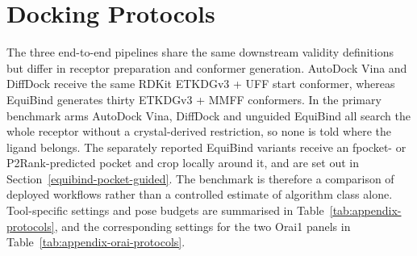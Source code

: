 \hypertarget{docking-protocols}{%
\chapter{Docking Protocols}\label{docking-protocols}}

The three end-to-end pipelines share the same downstream validity definitions but differ in receptor preparation and conformer generation. AutoDock Vina and DiffDock receive the same RDKit \cite{ref086} ETKDGv3 + UFF start conformer, whereas EquiBind generates thirty ETKDGv3 + MMFF conformers. In the primary benchmark arms AutoDock Vina, DiffDock and unguided EquiBind all search the whole receptor without a crystal-derived restriction, so none is told where the ligand belongs. The separately reported EquiBind variants receive an fpocket- or P2Rank-predicted pocket and crop locally around it, and are set out in Section~\ref{equibind-pocket-guided}. The benchmark is therefore a comparison of deployed workflows rather than a controlled estimate of algorithm class alone. Tool-specific settings and pose budgets are summarised in Table~\ref{tab:appendix-protocols}, and the corresponding settings for the two Orai1 panels in Table~\ref{tab:appendix-orai-protocols}.

